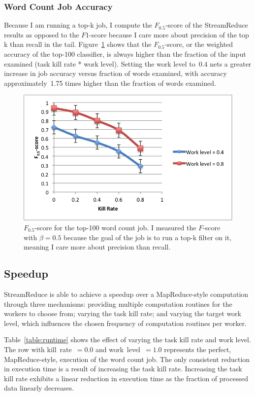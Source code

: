 \documentclass[12pt,twocolumn]{article}
\begin{document}
\subsubsection{Word Count Job Accuracy}
Because I am running a top-k job, I compute the $F_{0.5}$-score of the StreamReduce results as
opposed to the $F1$-score because I care more about precision of the top k than recall
in the tail. Figure~\ref{fig:fscore} shows that the $F_{0.5}$-score, or the weighted
accuracy of the top-100 classifier, is always higher than the fraction of the input
examined (task kill rate * work level). Setting the work level to~0.4 nets a greater increase
in job accuracy versus fraction of words examined, with accuracy approximately~1.75 times
higher than the fraction of words examined.

\begin{figure}
\includegraphics[width=\linewidth]{f-score.png}
\caption{$F_{0.5}$-score for the top-100 word count job. I measured the $F$-score with $\beta=0.5$ because the goal of the job is to run a top-k filter on it, meaning I care more about precision than recall.}
\label{fig:fscore}
\end{figure}

\subsection{Speedup}
StreamReduce is able to achieve a speedup over a MapReduce-style computation through three mechanisms:
providing multiple computation routines for the workers to choose from; varying the task kill
rate; and varying the target work level, which influences the chosen frequency of computation
routines per worker.

Table~\ref{table:runtime} shows the effect of varying the task kill rate and work level. The row
with kill~rate~$=0.0$ and work~level~$=1.0$ represents the perfect, MapReduce-style, execution
of the word count job. The only consistent reduction in execution time is a result of
increasing the task kill rate. Increasing the task kill rate exhibits a linear reduction in execution
time as the fraction of processed data linearly decreases.
\end{document}
